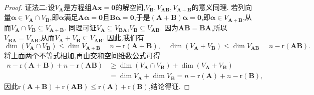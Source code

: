 \documentclass[../../main.tex]{subfiles}
\begin{document}
\begin{proof}
{\color{blue}证法二:}设\(V_{\boldsymbol{A}}\)是方程组\(\boldsymbol{A}\boldsymbol{x}=\boldsymbol{0}\)的解空间,\(V_{\boldsymbol{B}},V_{\boldsymbol{A}\boldsymbol{B}},V_{\boldsymbol{A}+\boldsymbol{B}}\)的意义同理. 若列向量\(\boldsymbol{\alpha}\in V_{\boldsymbol{A}}\cap V_{\boldsymbol{B}}\),即\(\boldsymbol{\alpha}\)满足\(\boldsymbol{A}\boldsymbol{\alpha}=\boldsymbol{0}\)且\(\boldsymbol{B}\boldsymbol{\alpha}=\boldsymbol{0}\),于是\((\boldsymbol{A}+\boldsymbol{B})\boldsymbol{\alpha}=\boldsymbol{0}\),即\(\boldsymbol{\alpha}\in V_{\boldsymbol{A}+\boldsymbol{B}}\),从而\(V_{\boldsymbol{A}}\cap V_{\boldsymbol{B}}\subseteq V_{\boldsymbol{A}+\boldsymbol{B}}\). 同理可证\(V_{\boldsymbol{A}}\subseteq V_{\boldsymbol{B}\boldsymbol{A}}\),\(V_{\boldsymbol{B}}\subseteq V_{\boldsymbol{A}\boldsymbol{B}}\). 因为\(\boldsymbol{A}\boldsymbol{B}=\boldsymbol{B}\boldsymbol{A}\),所以\(V_{\boldsymbol{B}\boldsymbol{A}} = V_{\boldsymbol{A}\boldsymbol{B}}\),从而\(V_{\boldsymbol{A}}+V_{\boldsymbol{B}}\subseteq V_{\boldsymbol{A}\boldsymbol{B}}\). 因此,我们有
\[
\dim(V_{\boldsymbol{A}}\cap V_{\boldsymbol{B}})\leqslant \dim V_{\boldsymbol{A}+\boldsymbol{B}}=n - \mathrm{r}(\boldsymbol{A}+\boldsymbol{B}),\quad\dim(V_{\boldsymbol{A}}+V_{\boldsymbol{B}})\leqslant \dim V_{\boldsymbol{A}\boldsymbol{B}}=n - \mathrm{r}(\boldsymbol{A}\boldsymbol{B}).
\]
将上面两个不等式相加,再由交和空间维数公式可得
\begin{align*}
n - \mathrm{r}(\boldsymbol{A}+\boldsymbol{B})+n - \mathrm{r}(\boldsymbol{A}\boldsymbol{B})&\geqslant \dim(V_{\boldsymbol{A}}\cap V_{\boldsymbol{B}})+\dim(V_{\boldsymbol{A}}+V_{\boldsymbol{B}})\\
&=\dim V_{\boldsymbol{A}}+\dim V_{\boldsymbol{B}}=n - \mathrm{r}(\boldsymbol{A})+n - \mathrm{r}(\boldsymbol{B}),
\end{align*}
因此\(\mathrm{r}(\boldsymbol{A}+\boldsymbol{B})+\mathrm{r}(\boldsymbol{A}\boldsymbol{B})\leqslant \mathrm{r}(\boldsymbol{A})+\mathrm{r}(\boldsymbol{B})\),结论得证.


\end{proof}
\end{document}
